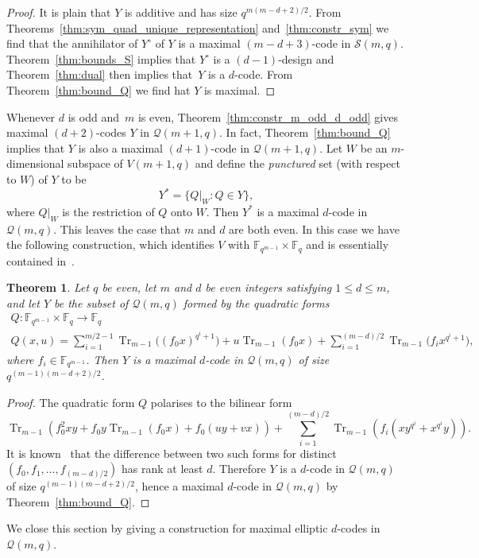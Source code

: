 \documentclass[10pt]{article}
\newtheorem{theorem}{Theorem}[section]
\theoremstyle{definition}
\newcommand{\FF}{\mathbb{F}}
\newcommand{\Q}{\mathscr{Q}}
\renewcommand{\S}{\mathscr{S}}
\DeclareMathOperator{\Tr}{Tr}
\begin{document}
\begin{proof}
It is plain that $Y$ is additive and has size $q^{m(m-d+2)/2}$. From Theorems~\ref{thm:sym_quad_unique_representation} and~\ref{thm:constr_sym} we find that the annihilator of $Y^\circ$ of $Y$ is a maximal $(m-d+3)$-code in $\S(m,q)$. Theorem~\ref{thm:bounds_S} implies that $Y^\circ$ is a $(d-1)$-design and Theorem~\ref{thm:dual} then implies that~$Y$ is a $d$-code. From Theorem~\ref{thm:bound_Q} we find hat $Y$ is maximal.
\end{proof}
\par
Whenever $d$ is odd and~$m$ is even, Theorem~\ref{thm:constr_m_odd_d_odd} gives maximal $(d+2)$-codes $Y$ in $\Q(m+1,q)$. In fact, Theorem~\ref{thm:bound_Q} implies that $Y$ is also a maximal $(d+1)$-code in $\Q(m+1,q)$. Let $W$ be an $m$-dimensional subspace of $V(m+1,q)$ and define the \emph{punctured} set (with respect to $W$) of $Y$ to be
\[
Y^*=\big\{Q|_W:Q\in Y\big\},
\]
where $Q|_W$ is the restriction of $Q$ onto $W$. Then $Y^*$ is a maximal $d$-code in $\Q(m,q)$. This leaves the case that $m$ and $d$ are both even. In this case we have the following construction, which identifies $V$ with $\FF_{q^{m-1}}\times\FF_q$ and is essentially contained in~\cite{DelGoe1975}.
\begin{theorem}
\label{thm:constr_elliptic_codes}
Let $q$ be even, let $m$ and $d$ be even integers satisfying $1\le d\le m$, and let $Y$ be the subset of $\Q(m,q)$ formed by the quadratic forms
\begin{gather*}
Q:\FF_{q^{m-1}}\times\FF_q\to\FF_q\\
Q(x,u)=\sum_{i=1}^{m/2-1}\Tr_{m-1}\big((f_0x)^{q^i+1}\big)+u\Tr_{m-1}(f_0x)+\sum_{i=1}^{(m-d)/2}\Tr_{m-1}\big(f_ix^{q^i+1}\big),
\end{gather*}
where $f_i\in\FF_{q^{m-1}}$. Then $Y$ is a maximal $d$-code in $\Q(m,q)$ of size $q^{(m-1)(m-d+2)/2}$.
\end{theorem}
\begin{proof}
The quadratic form $Q$ polarises to the bilinear form
\[
\Tr_{m-1}(f_0^2xy+f_0y\Tr_{m-1}(f_0x)+f_0(uy+vx))+\sum_{i=1}^{(m-d)/2}\Tr_{m-1}(f_i(xy^{q^i}+x^{q^i}y)).
\]
It is known~\cite[Theorem~9]{DelGoe1975} that the difference between two such forms for distinct $(f_0,f_1,\dots,f_{(m-d)/2})$ has rank at least $d$. Therefore $Y$ is a $d$-code in $\Q(m,q)$ of size $q^{(m-1)(m-d+2)/2}$, hence a maximal $d$-code in $\Q(m,q)$ by Theorem~\ref{thm:bound_Q}.
\end{proof}
\par
We close this section by giving a construction for maximal elliptic $d$-codes in~$\Q(m,q)$.
\end{document}
